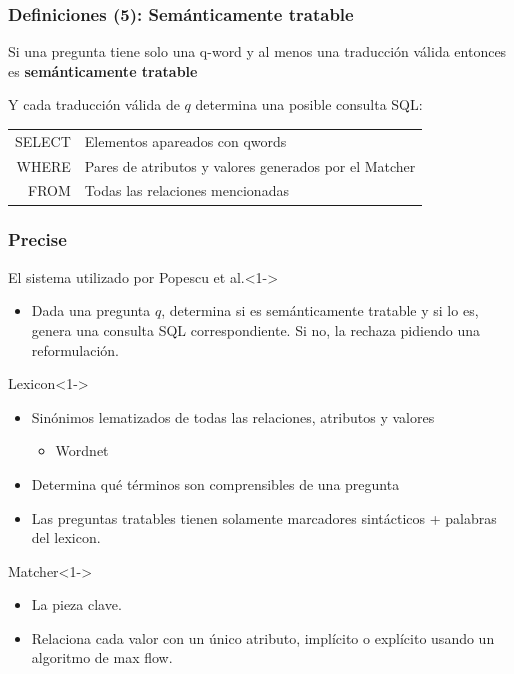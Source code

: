 \documentclass{beamer}
\begin{document}
\fontsize{10pt}{11.2}\selectfont
\begin{frame}[<+->]
\frametitle{Definiciones (5): Semánticamente tratable}
Si una pregunta tiene solo una q-word y al menos una traducción válida entonces es \textbf{semánticamente tratable}

\bigskip
\bigskip

Y cada traducción válida de $q$ determina una posible consulta SQL:
\bigskip
\centering
\begin{tabular}{ r | l }
SELECT &  Elementos apareados con qwords \\
WHERE & Pares de atributos y valores generados por el Matcher\\
FROM & Todas las relaciones mencionadas \\
\end{tabular}
\end{frame}


\fontsize{9.5pt}{7.2}\selectfont
\begin{frame}
\frametitle{Precise}

  \begin{block}{El sistema utilizado por Popescu et al.}<1->
      \begin{itemize}
          \item Dada una pregunta $q$, determina si es semánticamente tratable y si lo es, genera una consulta SQL correspondiente. Si no, la rechaza pidiendo una reformulación.
        \end{itemize}
    \end{block}
   \begin{block}{Lexicon}<1->
      \begin{itemize}
          \item Sinónimos lematizados de todas las relaciones, atributos y valores
          \begin{itemize}
            \item Wordnet
          \end{itemize}
          \item Determina qué términos son comprensibles de una pregunta
          \item Las preguntas tratables tienen solamente marcadores sintácticos + palabras del lexicon.
        \end{itemize}
    \end{block}
    \begin{block}{Matcher}<1->
      \begin{itemize}
          \item La pieza clave.
          \item Relaciona cada valor con un único atributo, implícito o explícito usando un algoritmo de max flow.
      \end{itemize}
    \end{block}
\end{frame}
\end{document}
